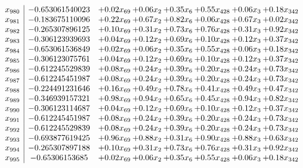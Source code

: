 \documentclass[8pt]{article}
\begin{document}
\[\begin{array}{c| c c@{\hskip 2pt} c@{\hskip 2pt} c@{\hskip 2pt} c@{\hskip 2pt} c@{\hskip 2pt} c@{\hskip 2pt} }
 x_{980}   &  -0.653061540023 & +  0.02 x_{69} & +  0.06 x_{2} & +  0.35 x_{6} & +  0.55 x_{428} & +  0.06 x_{3} & +  0.18 x_{342}\\
 x_{981}   &  -0.183675110096 & +  0.22 x_{69} & +  0.67 x_{2} & +  0.82 x_{6} & +  0.06 x_{428} & +  0.67 x_{3} & +  0.02 x_{342}\\
 x_{982}   &  -0.265307896125 & +  0.10 x_{69} & +  0.31 x_{2} & +  0.73 x_{6} & +  0.76 x_{428} & +  0.31 x_{3} & +  0.92 x_{342}\\
 x_{983}   &  -0.306123939693 & +  0.04 x_{69} & +  0.12 x_{2} & +  0.69 x_{6} & +  0.10 x_{428} & +  0.12 x_{3} & +  0.37 x_{342}\\
 x_{984}   &  -0.653061536849 & +  0.02 x_{69} & +  0.06 x_{2} & +  0.35 x_{6} & +  0.55 x_{428} & +  0.06 x_{3} & +  0.18 x_{342}\\
 x_{985}   &  -0.306123075761 & +  0.04 x_{69} & +  0.12 x_{2} & +  0.69 x_{6} & +  0.10 x_{428} & +  0.12 x_{3} & +  0.37 x_{342}\\
 x_{986}   &  -0.612245529839 & +  0.08 x_{69} & +  0.24 x_{2} & +  0.39 x_{6} & +  0.20 x_{428} & +  0.24 x_{3} & +  0.73 x_{342}\\
 x_{987}   &  -0.612245451987 & +  0.08 x_{69} & +  0.24 x_{2} & +  0.39 x_{6} & +  0.20 x_{428} & +  0.24 x_{3} & +  0.73 x_{342}\\
 x_{988}   &  -0.224491231646 & +  0.16 x_{69} & +  0.49 x_{2} & +  0.78 x_{6} & +  0.41 x_{428} & +  0.49 x_{3} & +  0.47 x_{342}\\
 x_{989}   &  -0.346939157321 & +  0.98 x_{69} & +  0.94 x_{2} & +  0.65 x_{6} & +  0.45 x_{428} & +  0.94 x_{3} & +  0.82 x_{342}\\
 x_{990}   &  -0.306123114687 & +  0.04 x_{69} & +  0.12 x_{2} & +  0.69 x_{6} & +  0.10 x_{428} & +  0.12 x_{3} & +  0.37 x_{342}\\
 x_{991}   &  -0.612245451987 & +  0.08 x_{69} & +  0.24 x_{2} & +  0.39 x_{6} & +  0.20 x_{428} & +  0.24 x_{3} & +  0.73 x_{342}\\
 x_{992}   &  -0.612245529839 & +  0.08 x_{69} & +  0.24 x_{2} & +  0.39 x_{6} & +  0.20 x_{428} & +  0.24 x_{3} & +  0.73 x_{342}\\
 x_{993}   &  -0.693877619425 & +  0.96 x_{69} & +  0.88 x_{2} & +  0.31 x_{6} & +  0.90 x_{428} & +  0.88 x_{3} & +  0.63 x_{342}\\
 x_{994}   &  -0.265307897188 & +  0.10 x_{69} & +  0.31 x_{2} & +  0.73 x_{6} & +  0.76 x_{428} & +  0.31 x_{3} & +  0.92 x_{342}\\
 x_{995}   &  -0.65306153685 & +  0.02 x_{69} & +  0.06 x_{2} & +  0.35 x_{6} & +  0.55 x_{428} & +  0.06 x_{3} & +  0.18 x_{342}\\

\end{array}\]
\end{document}
